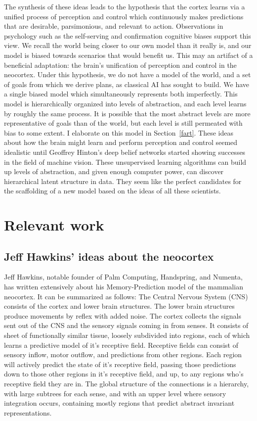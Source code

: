 \documentclass[12pt]{article}
\begin{document}
The synthesis of these ideas leads to the hypothesis that the cortex learns via a unified process of perception and control which continuously makes predictions that are desirable, parsimonious, and relevant to action. Observations in psychology such as the self-serving and confirmation cognitive biases support this view. We recall the world being closer to our own model than it really is, and our model is biased towards scenarios that would benefit us. This may an artifact of a beneficial adaptation: the brain's unification of perception and control in the neocortex. Under this hypothesis, we do not have a model of the world, and a set of goals from which we derive plans, as classical AI has sought to build. We have a single biased model which simultaneously represents both imperfectly. This model is hierarchically organized into levels of abstraction, and each level learns by roughly the same process. It is possible that the most abstract levels are more representative of goals than of the world, but each level is still permeated with bias to some extent. I elaborate on this model in Section~\ref{fart}. These ideas about how the brain might learn and perform perception and control seemed idealistic until Geoffrey Hinton's deep belief networks started showing successes in the field of machine vision. These unsupervised learning algorithms can build up levels of abstraction, and given enough computer power, can discover hierarchical latent structure in data. They seem like the perfect candidates for the scaffolding of a new model based on the ideas of all these scientists. 

\section{Relevant work}
 
	\subsection{Jeff Hawkins' ideas about the neocortex}
	
Jeff Hawkins, notable founder of Palm Computing, Handspring, and Numenta, has written extensively about his Memory-Prediction model of the mammalian neocortex. It can be summarized as follows: The Central Nervous System (CNS) consists of the cortex and lower brain structures. The lower brain structures produce movements by reflex with added noise. The cortex collects the signals sent out of the CNS and the sensory signals coming in from senses. It consists of sheet of functionally similar tissue, loosely subdivided into regions, each of which learns a predictive model of it's receptive field. Receptive fields can consist of sensory inflow, motor outflow, and predictions from other regions. Each region will actively predict the state of it's receptive field, passing those predictions down to those other regions in it's receptive field, and up, to any regions who's receptive field they are in. The global structure of the connections is a hierarchy, with large subtrees for each sense, and with an upper level where sensory integration occurs, containing mostly regions that predict abstract invariant representations.
\end{document}

